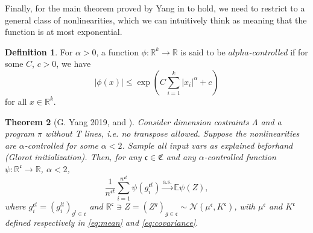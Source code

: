 \documentclass[11pt,notitlepage]{article}
\numberwithin{equation}{section}
\def\R{{\mathbb{R}}}
\def\normdist{\mathcal{N}}
\def\asconv{\stackrel{\text{a.s.}}{\longrightarrow}}
\newtheorem{theorem}{Theorem}[section]
\theoremstyle{remark}
\theoremstyle{definition}
\newtheorem{definition_body}[theorem]{Definition}
\newcommand{\definition}[1]{
	\theoremstyle{definition}
	\begin{definition_body}
		#1
	\end{definition_body}
	\theoremstyle{plain}
}
\begin{document}
	Finally, for the main theorem proved by Yang in \cite{yang2019scaling} to hold, we need to restrict to a general class of nonlinearities, which we can intuitively think as meaning that the function is at most exponential.
	
	\definition{
		For $\alpha > 0$, a function $\phi : \R^k \rightarrow \R$ is said to be \emph{$alpha$-controlled} if for some $C$, $c > 0$, we have
		\begin{equation}
		|\phi(x)| \leq \exp\left(C \sum_{i=1}^k|x_i|^\alpha + c \right)
		\end{equation}
		for all $x \in \R^k$.
	}
	
	\begin{theorem}[G. Yang 2019, \cite{yang2019scaling} and \cite{yang2019tensor}]\label{thm:yangMaster}
		Consider dimension costraints $\Lambda$ and a program $\pi$ without T lines, i.e. no transpose allowed. Suppose the nonlinearities are $\alpha$-controlled for some $\alpha <2$. Sample all input vars as explained beforhand (Glorot initialization). Then, for any $\mathfrak{c} \in \mathfrak{C}$ and any $\alpha$-controlled function $\psi : \R^{\mathfrak{c}} \rightarrow \R$, $\alpha < 2$,
		\begin{equation}
		\frac{1}{n^{\mathfrak{c}t}}\sum_{i=1}^{n^{\mathfrak{c}t}} \psi (g_i^{\mathfrak{c}t}) 
		\asconv \mathbb{E}\psi(Z),
		\end{equation}
		where $g^{\mathfrak{c}t}_i = (g^{lt}_i)_{g^l \in \mathfrak{c}}$ and $\R^{\mathfrak{c}} \ni Z = (Z^g)_{g \in \mathfrak{c}} \sim \normdist(\mu^{\mathfrak{c}}, K^{\mathfrak{c}})$, with $\mu^{\mathfrak{c}}$ and $K^{\mathfrak{c}}$ defined respectively in \eqref{eq:mean} and \eqref{eq:covariance}.
	\end{theorem}
	
\end{document}
